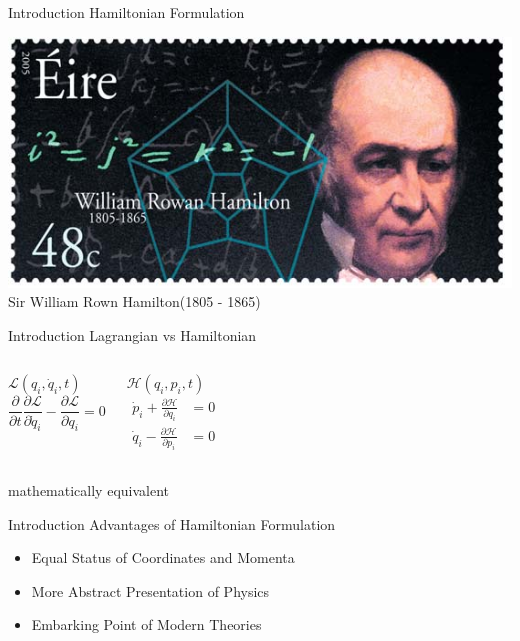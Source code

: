 \documentclass[xcolor=dvipsnames]{beamer}
\begin{document}
	\begin{frame}{Introduction}
		Hamiltonian Formulation
		\begin{center}
			\includegraphics[scale=1.0]{hamilton.jpg}\\
			\tiny{Sir William Rown Hamilton(1805 - 1865)}
		\end{center}
	\end{frame}
	\begin{frame}{Introduction}
		Lagrangian vs Hamiltonian
		\begin{columns}[c]
			\column{2in}
			\begin{center}
				$\mathcal{L}(q_{i}, {\dot q}_{i}, t)$
				\begin{equation*}
					\frac{\partial}{\partial t}\frac{\partial \mathcal{L}}{\partial {\dot q_{i}}} - \frac{\partial \mathcal{L}}{\partial q_{i}} = 0
				\end{equation*}	
			\end{center}
			\column{2in}
			\begin{center}
				$\mathcal{H}(q_{i}, p_{i}, t)$	
				\begin{align*}
					{\dot p}_{i} + \frac{\partial \mathcal{H}}{\partial q_{i}} &= 0	\\
					{\dot q}_{i} - \frac{\partial \mathcal{H}}{\partial p_{i}} &= 0
				\end{align*}
			\end{center}
		\end{columns}
		\pause
		\begin{center}
			\Large{mathematically equivalent}
		\end{center}
	\end{frame}
	\begin{frame}{Introduction}
		Advantages of Hamiltonian Formulation
		\begin{itemize}
			\item{Equal Status of Coordinates and Momenta}
			\item{More Abstract Presentation of Physics}
			\item{Embarking Point of Modern Theories}
		\end{itemize}
	\end{frame}
\end{document}
